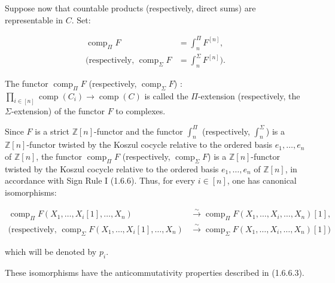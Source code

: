 %
Suppose now that countable products (respectively, direct sums) are
representable in $C$. Set:

\begin{equation}
  \begin{aligned}
    \operatorname{comp}_{\Pi}F
      &=\int_n^{\Pi}F^{[n]},\\
    \text{(respectively, }\operatorname{comp}_{\Sigma}F
      &=\int_n^{\Sigma}F^{[n]}\text{)}.
  \end{aligned}
  \tag{2.4.2.6}
\end{equation}

The functor
$\operatorname{comp}_{\Pi}F$ (respectively,
$\operatorname{comp}_{\Sigma}F$) :
$\prod_{i\in[n]}\operatorname{comp}(C_i)\longrightarrow
\operatorname{comp}(C)$ is called the $\Pi$-extension (respectively, the
$\Sigma$-extension) of the functor $F$ to complexes.

Since $F$ is a strict $\mathbb Z[n]$-functor and the functor
$\int_n^{\Pi}$ (respectively, $\int_n^{\Sigma}$) is a
$\mathbb Z[n]$-functor twisted by the Koszul cocycle relative to the ordered
basis $e_1,\ldots,e_n$ of $\mathbb Z[n]$, the functor
$\operatorname{comp}_{\Pi}F$ (respectively,
$\operatorname{comp}_{\Sigma}F$) is a $\mathbb Z[n]$-functor twisted by the
Koszul cocycle relative to the ordered basis $e_1,\ldots,e_n$ of
$\mathbb Z[n]$, in accordance with Sign Rule I (1.6.6). Thus, for every
$i\in[n]$, one has canonical isomorphisms:

\begin{equation}
  \begin{aligned}
    \operatorname{comp}_{\Pi}F(X_1,\ldots,X_i[1],\ldots,X_n)
      &\xrightarrow{\sim}
      \operatorname{comp}_{\Pi}F(X_1,\ldots,X_i,\ldots,X_n)[1],\\
    \text{(respectively, }\operatorname{comp}_{\Sigma}F(X_1,\ldots,X_i[1],\ldots,X_n)
      &\xrightarrow{\sim}
      \operatorname{comp}_{\Sigma}F(X_1,\ldots,X_i,\ldots,X_n)[1]\text{)}
  \end{aligned}
  \tag{2.4.2.7}
\end{equation}

which will be denoted by $p_i$.

These isomorphisms have the anticommutativity properties described in
(1.6.6.3).

